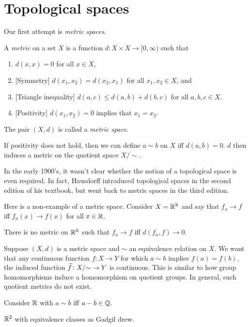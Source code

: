 \chapter{Topological spaces} \label{chp:topo}
Our first attempt is \emph{metric spaces}.
\begin{definition} \label{def:metric-space}
    A \emph{metric} on a set $X$ is a function
    $d\colon X \times X \to [0, \infty)$
    such that
    \begin{enumerate}[label=(M\arabic*)]
        \item $d(x, x) = 0$ for all $x \in X$,
        \item{} [Symmetry] $d(x_1, x_2) = d(x_2, x_1)$ for all
            $x_1, x_2 \in X$, and
        \item{} [Triangle inequality]
            $d(a, c) \le d(a, b) + d(b, c)$ for all $a, b, c \in X$.
        \item{} [Positivity] $d(x_1, x_2) = 0$ implies that
            $x_1 = x_2$.
    \end{enumerate}
    The pair $(X, d)$ is called a \emph{metric space}.
\end{definition}
\begin{remark}
    If positivity does not hold, then we can define $a \sim b$ on $X$ iff
    $d(a, b) = 0$.
    $d$ then induces a metric on the quotient space $X/{\sim}$.
\end{remark}
In the early 1900's, it wasn't clear whether the notion of a topological
space is even required.
In fact, Hausdorff introduced topological spaces in the second edition of
his textbook, but went back to metric spaces in the third edition.

Here is a non-example of a metric space.
Consider $X = \mathbb{R}^{\mathbb{R}}$ and say that $f_n \to f$ iff $f_n(x) \to f(x)$ for all
$x \in \mathbb{R}$.
\begin{claim} \label{thm:non-metric}
    There is no metric on $\mathbb{R}^{\mathbb{R}}$ such that $f_n \to f$ iff
    $d(f_n, f) \to 0$.
\end{claim}

Suppose $(X, d)$ is a metric space and $\sim$ an equivalence relation on
$X$.
We want that any continuous function $f\colon X \to Y$ for which
$a \sim b$ implies $f(a) = f(b)$, the induced function
$\widetilde{f}\colon X/{\sim} \to Y$ is continuous.
This is similar to how group homomorphisms induce a homomorphism on quotient
groups.
In general, such quotient metrics do not exist.
\begin{examples}
    \item Consider $\mathbb{R}$ with $a \sim b$ iff $a - b \in \mathbb{Q}$.
    \item $\mathbb{R}^2$ with equivalence classes as Gadgil drew.
\end{examples}

